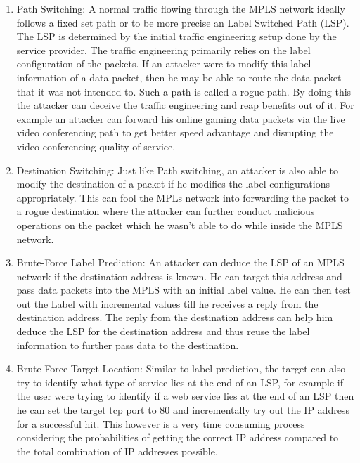 \begin{enumerate}
\item Path Switching:
A normal traffic flowing through the MPLS network ideally follows a fixed set path or to be more precise an Label Switched Path (LSP). The LSP is determined by the initial traffic engineering setup done by the service provider. The traffic engineering primarily relies on the label configuration of the packets. If an attacker were to modify this label information of a data packet, then he may be able to route the data packet that it was not intended to. Such a path is called a rogue path. By doing this the attacker can deceive the traffic engineering and reap benefits out of it. For example
an attacker can forward his online gaming data packets via the live video conferencing path to get better speed advantage and disrupting the video conferencing quality of service.

\item Destination Switching:
Just like Path switching, an attacker is also able to modify the destination of a packet if he modifies the label configurations appropriately. This can fool the MPLs network into forwarding the packet to a rogue destination where the attacker can further conduct malicious operations on the packet which he wasn't able to do while inside the MPLS network.

\item Brute-Force Label Prediction:
An attacker can deduce the LSP of an MPLS network if the destination address is known. He can target this address and pass data packets into the MPLS
with an initial label value. He can then test out the Label with incremental values till he receives a reply from the destination address. The reply from the destination address can help him deduce the LSP for the destination address and thus reuse the label information to further pass data to the destination. 

\item Brute Force Target Location:
Similar to label prediction, the target can also try to identify what type of service lies at the end of an LSP, for example if the user were trying to identify if a web service lies at the end of an LSP then he can set the target tcp port to 80 and incrementally try out the IP address for a successful hit. This however is a very time consuming process considering the probabilities of getting the correct IP address compared to the total combination of IP addresses possible.


\end{enumerate}
